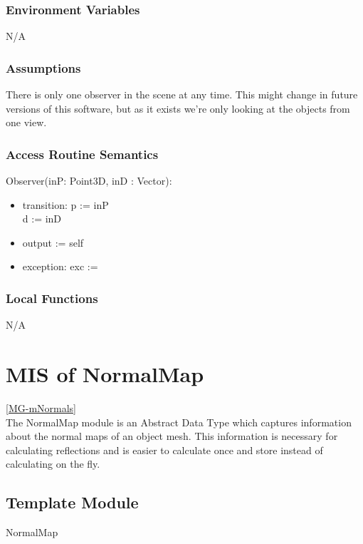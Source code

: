 \documentclass[12pt, titlepage]{article}
\begin{document}
\subsubsection{Environment Variables}
N/A

\subsubsection{Assumptions}
There is only one observer in the scene at any time. This might change in 
future versions of this software, but as it exists we're only looking at the 
objects from one view.

\subsubsection{Access Routine Semantics}
\noindent Observer(inP: Point3D, inD : Vector):
\begin{itemize}
	\item transition: p := inP \\
	d := inD
	\item output := self
	\item exception: exc :=
\end{itemize}

\subsubsection{Local Functions}
N/A

\newpage

\section{MIS of NormalMap} \ref{MG-mNormals} \\
The NormalMap module is an Abstract Data Type which captures information about 
the normal maps of an object mesh. This information is necessary for 
calculating reflections and is easier to calculate once and store instead of 
calculating on the fly.

\subsection{Template Module}
NormalMap
\end{document}
